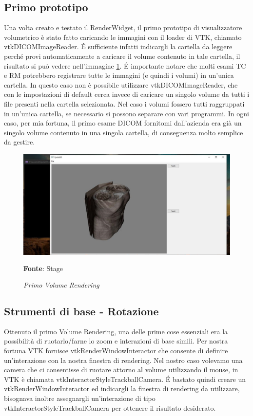 \subsection{Primo prototipo}
Una volta creato e testato il RenderWidget, il primo prototipo di visualizzatore volumetrico è stato fatto caricando le immagini con il loader di VTK, chiamato vtkDICOMImageReader. \'E sufficiente infatti indicargli la cartella da leggere perché provi automaticamente a caricare il volume contenuto in tale cartella, il risultato si può vedere nell'immagine \ref{fig: firstvolume}. \'E importante notare che molti esami TC e RM potrebbero registrare tutte le immagini (e quindi i volumi) in un'unica cartella. In questo caso non è possibile utilizzare vtkDICOMImageReader, che con le impostazioni di default cerca invece di caricare un singolo volume da tutti i file presenti nella cartella selezionata. Nel caso i volumi fossero tutti raggruppati in un'unica cartella, se necessario si possono separare con vari programmi. In ogni caso, per mia fortuna, il primo esame DICOM fornitomi dall'azienda era già un singolo volume contenuto in una singola cartella, di conseguenza molto semplice da gestire.

\begin{figure}[h]
    \centering
    \includegraphics[width=1\textwidth]{immagini/svolgimento/firstvolume.jpg}
    \caption{\textit{Primo Volume Rendering}}
    \textbf{Fonte}: Stage
    \label{fig: firstvolume}
\end{figure}

\subsection{Strumenti di base - Rotazione}
Ottenuto il primo Volume Rendering, una delle prime cose essenziali era la possibilità di ruotarlo/farne lo zoom e interazioni di base simili. Per nostra fortuna VTK fornisce vtkRenderWindowInteractor che consente di definire un'interazione con la nostra finestra di rendering. Nel nostro caso volevamo una camera che ci consentisse di ruotare attorno al volume utilizzando il mouse, in VTK è chiamata vtkInteractorStyleTrackballCamera. \'E bastato quindi creare un vtkRenderWindowInteractor ed indicargli la finestra di rendering da utilizzare, bisognava inoltre assegnargli un'interazione di tipo vtkInteractorStyleTrackballCamera per ottenere il risultato desiderato.

